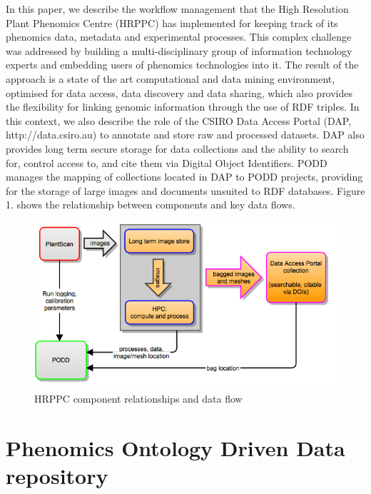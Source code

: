 \documentclass{llncs}
\begin{document}
In this paper, we describe the workflow management that the High Resolution
Plant Phenomics Centre (HRPPC) has implemented for keeping track of its
phenomics data, metadata and experimental processes. This complex challenge was
addressed by building a multi-disciplinary group of information technology
experts and embedding users of phenomics technologies into it. The result of the
approach is a state of the art computational and data mining environment,
optimised for data access, data discovery and data sharing, which also provides
the flexibility for linking genomic information through the use of RDF triples.
In this context, we also describe the role of the CSIRO Data Access Portal (DAP,
http://data.csiro.au) to annotate and store raw and processed datasets. DAP also
provides long term secure storage for data collections and the ability to search
for, control access to, and cite them via Digital Object Identifiers. PODD
manages the mapping of collections located in DAP to PODD projects, providing
for the storage of large images and documents unsuited to RDF databases. Figure 1. shows
the relationship between components and key data flows.


\begin{figure}
\begin{center}
 \includegraphics[width=12cm,keepaspectratio=true]{plantscan-workflow-figure1.png}

\caption{HRPPC component relationships and data flow}
\label{hrppccomponents}
\end{center}
\end{figure}


\section{Phenomics Ontology Driven Data repository}
\end{document}
